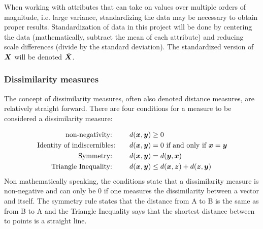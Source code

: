 When working with attributes that can take on values over multiple orders of magnitude, i.e. large variance,  standardizing the data may be necessary to obtain proper results. Standardization of data in this project will be done by centering the data (mathematically, subtract the mean of each attribute) and reducing scale differences (divide by the standard deviation). The standardized version of $\bm{X}$ will be denoted $\tilde{\bm{X}}$.

\subsubsection{Dissimilarity measures}
The concept of dissimilarity measures, often also denoted distance measures, are relatively straight forward. There are four conditions for a measure to be considered a dissimilarity measure: \citep{mueller_kussesne}

\begin{align}
\text{non-negativity: }\qquad & d(\bm{x},\bm{y}) \geq 0 \\
\text{Identity of indiscernibles:}\qquad&  d(\bm{x},\bm{y}) = 0 \text{ if and only if }\bm{x}=\bm{y} \\
\text{Symmetry: } \qquad & d(\bm{x},\bm{y}) = d(\bm{y},\bm{x}) \\
\text{Triangle Inequality: } \qquad & d(\bm{x},\bm{y}) \leq d(\bm{x},\bm{z}) + d(\bm{z},\bm{y})
\end{align}
Non mathematically speaking, the conditions state that a dissimilarity measure is non-negative and can only be 0 if one measures the dissimilarity between a vector and itself. The symmetry rule states that the distance from A to B is the same as from B to A and the Triangle Inequality says that the shortest distance between to points is a straight line.



